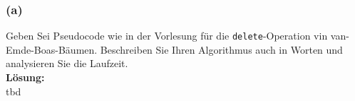 \subsubsection*{(a)}


Geben Sei Pseudocode wie in der Vorlesung für die \lstinline|delete|-Operation vin van-Emde-Boas-Bäumen. Beschreiben Sie Ihren Algorithmus auch in Worten und analysieren Sie die Laufzeit.\\

\noindent\textbf{Lösung:}\\

tbd


